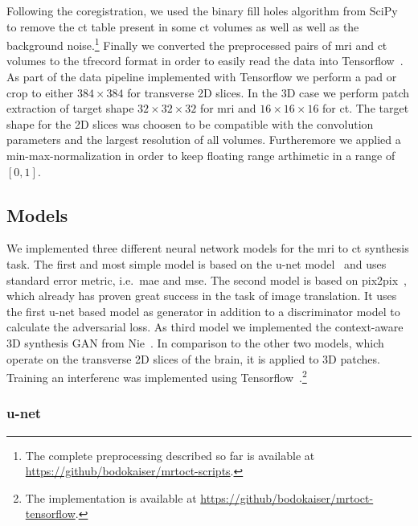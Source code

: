 Following the coregistration, we used the binary fill holes algorithm from
SciPy~\cite{SciPy} to remove the \gls{ct} table present in some \gls{ct}
volumes as well as well as the background noise.\footnote{The complete
preprocessing described so far is available at
\url{https://github/bodokaiser/mrtoct-scripts}.} Finally we converted the
preprocessed pairs of \gls{mri} and \gls{ct} volumes to the tfrecord format
in order to easily read the data into Tensorflow~\cite{Tensorflow15}. As part
of the data pipeline implemented with Tensorflow we perform a pad or crop to
either $384\times384$ for transverse 2D slices. In the 3D case we perform
patch extraction of target shape $32\times32\times32$ for \gls{mri} and
$16\times16\times16$ for \gls{ct}. The target shape for the 2D slices was
choosen to be compatible with the convolution parameters and the largest
resolution of all volumes. Furtheremore we applied a min-max-normalization in
order to keep floating range arthimetic in a range of $[0,1]$.

\subsection{Models}

We implemented three different neural network models for the \gls{mri} to
\gls{ct} synthesis task. The first and most simple model is based on the
u-net model~\cite{Ronneberger15} and uses standard error metric, i.e.\
\gls{mae} and \gls{mse}. The second model is based on pix2pix~\cite{Isola16},
which already has proven great success in the task of image translation. It
uses the first u-net based model as generator in addition to a discriminator
model to calculate the adversarial loss. As third model we implemented the
context-aware 3D synthesis GAN from Nie~\cite{Nie16}. In comparison to the
other two models, which operate on the transverse 2D slices of the brain, it
is applied to 3D patches. Training an interferenc was implemented using
Tensorflow~\cite{Tensorflow15}.\footnote{The implementation is available at
\url{https://github/bodokaiser/mrtoct-tensorflow}.}

\subsubsection{u-net}

